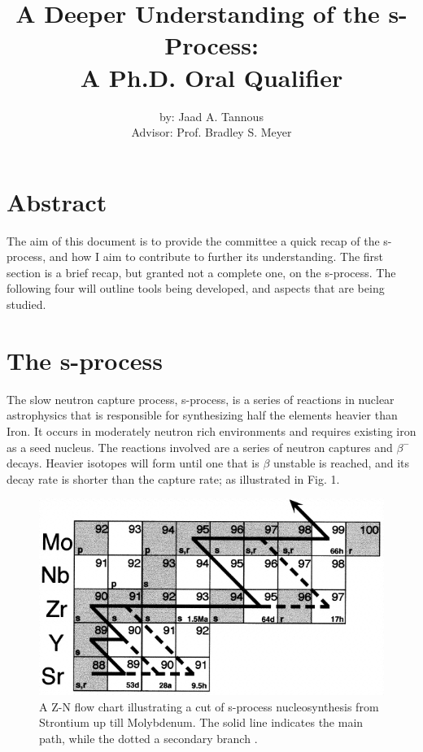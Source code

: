 \documentclass{article}
\title{A Deeper Understanding of the s-Process:\\
A Ph.D. Oral Qualifier}
\author{by: Jaad A. Tannous\\
Advisor: Prof. Bradley S. Meyer}
\date{}
\begin{document}
\maketitle

\section*{Abstract}
The aim of this document is to provide the committee a quick recap of the s-process, and how I aim to 
contribute to further its understanding. The first section is a brief recap, but granted not a complete 
one, on the s-process. The following four will outline tools being developed, and aspects that are being 
studied.

\section*{The s-process}
The slow neutron capture process, s-process, is a series of reactions in nuclear astrophysics that is responsible 
for synthesizing half the elements heavier than Iron. It occurs in moderately neutron rich environments and requires 
existing iron as a seed nucleus. The reactions involved are a series of neutron captures and $\beta^{-}$ decays. Heavier 
isotopes will form until one that is $\beta$ unstable is reached, and its decay rate is shorter than the capture rate; as illustrated 
in Fig. 1.

\begin{figure}[!htp]
    \centerline{\includegraphics[scale = 0.5]{images/sprocess.png}}
    \caption{A Z-N flow chart illustrating a cut of s-process nucleosynthesis from Strontium up till 
    Molybdenum. The solid line indicates the main path, while the dotted a secondary branch \cite{nic98}.}
\end{figure}
\end{document}
